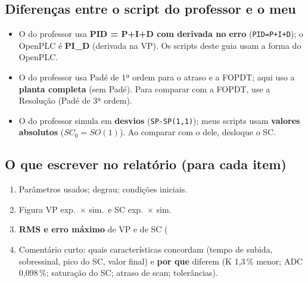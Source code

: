 \documentclass[11pt,a4paper]{article}
\begin{document}
\subsection{Diferenças entre o script do professor e o meu}
\begin{itemize}
\item O do professor usa \textbf{PID = P+I+D com derivada no erro} (\texttt{PID=P+I+D}); o OpenPLC é \textbf{PI\_D} (derivada na VP). Os scripts deste guia usam a forma do OpenPLC.
\item O do professor usa Padé de 1ª ordem para o atraso e a FOPDT; aqui uso a \textbf{planta completa} (sem Padé). Para comparar com a FOPDT, use a Resolução (Padé de 3ª ordem).
\item O do professor simula em \textbf{desvios} (\texttt{SP-SP(1,1)}); meus scripts usam \textbf{valores absolutos} ($SC_0=SO(1)$). Ao comparar com o dele, desloque o SC.
\end{itemize}
\subsection{O que escrever no relatório (para cada item)}
\begin{enumerate}
\item Parâmetros usados; degrau; condições iniciais.
\item Figura VP exp.\ $\times$ sim.\ e SC exp.\ $\times$ sim.
\item \textbf{RMS e erro máximo} de VP e de SC (%
\item Comentário curto: quais características concordam (tempo de subida, sobressinal, pico do SC, valor final) e \textbf{por que} diferem (K 1,3\,\% menor; ADC 0,098\,\%; saturação do SC; atraso de scan; tolerâncias).
\end{enumerate}
\end{document}
